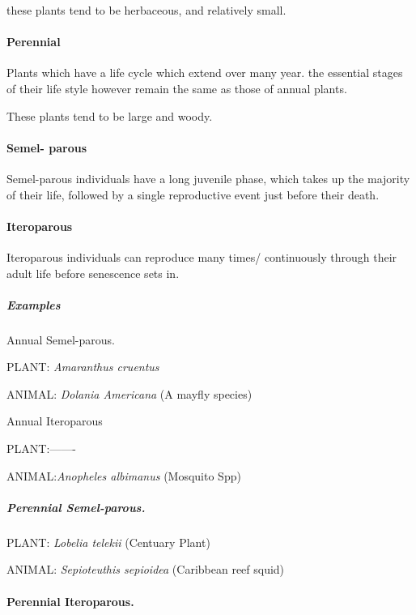 \documentclass[]{article}
\let\oldparagraph\paragraph
\renewcommand{\paragraph}[1]{\oldparagraph{#1}\mbox{}}
\let\oldsubparagraph\subparagraph
\renewcommand{\subparagraph}[1]{\oldsubparagraph{#1}\mbox{}}
\begin{document}
these plants tend to be herbaceous, and relatively small.

\hypertarget{perennial}{%
\paragraph{Perennial}\label{perennial}}

Plants which have a life cycle which extend over many year. the
essential stages of their life style however remain the same as those of
annual plants.

These plants tend to be large and woody.

\hypertarget{semel--parous}{%
\paragraph{Semel- parous}\label{semel--parous}}

Semel-parous individuals have a long juvenile phase, which takes up the
majority of their life, followed by a single reproductive event just
before their death.

\hypertarget{iteroparous}{%
\paragraph{Iteroparous}\label{iteroparous}}

Iteroparous individuals can reproduce many times/ continuously through
their adult life before senescence sets in.

\hypertarget{examples}{%
\subparagraph{Examples}\label{examples}}

Annual Semel-parous.

PLANT: \emph{Amaranthus cruentus}

ANIMAL: \emph{Dolania Americana} (A mayfly species)

Annual Iteroparous

PLANT:-------

ANIMAL:\emph{Anopheles albimanus} (Mosquito Spp)

\hypertarget{perennial-semel-parous.}{%
\subparagraph{Perennial Semel-parous.}\label{perennial-semel-parous.}}

PLANT: \emph{Lobelia telekii} (Centuary Plant)

ANIMAL: \emph{Sepioteuthis sepioidea} (Caribbean reef squid)

\hypertarget{perennial-iteroparous.}{%
\paragraph{Perennial Iteroparous.}\label{perennial-iteroparous.}}
\end{document}
